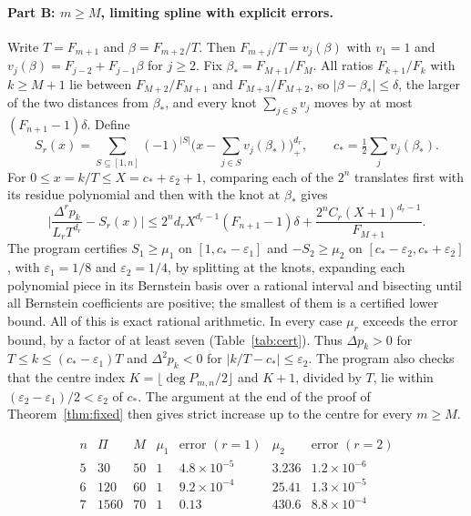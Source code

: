 \documentclass[11pt,a4paper]{article}
\theoremstyle{definition}\newtheorem{definition}[theorem]{Definition}
\theoremstyle{remark}\newtheorem{remark}[theorem]{Remark}\newtheorem{example}[theorem]{Example}
\numberwithin{equation}{section}
\begin{document}
\paragraph{Part B: $m\ge M$, limiting spline with explicit errors.} Write $T=F_{m+1}$ and $\beta=F_{m+2}/T$. Then $F_{m+j}/T=v_j(\beta)$ with $v_1=1$ and $v_j(\beta)=F_{j-2}+F_{j-1}\beta$ for $j\ge2$. Fix $\beta_*=F_{M+1}/F_M$. All ratios $F_{k+1}/F_k$ with $k\ge M+1$ lie between $F_{M+2}/F_{M+1}$ and $F_{M+3}/F_{M+2}$, so $|\beta-\beta_*|\le\delta$, the larger of the two distances from $\beta_*$, and every knot $\sum_{j\in S}v_j$ moves by at most $(F_{n+1}-1)\delta$. Define
\[
 S_r(x)=\sum_{S\subseteq[1,n]}(-1)^{|S|}\Big(x-\sum_{j\in S}v_j(\beta_*)\Big)_+^{d_r},\qquad c_*=\tfrac12\sum_jv_j(\beta_*).
\]
For $0\le x=k/T\le X=c_*+\varepsilon_2+1$, comparing each of the $2^n$ translates first with its residue polynomial and then with the knot at $\beta_*$ gives
\[
 \Big|\frac{\Delta^rp_k}{L_rT^{d_r}}-S_r(x)\Big|\le 2^nd_rX^{d_r-1}(F_{n+1}-1)\delta+\frac{2^nC_r(X+1)^{d_r-1}}{F_{M+1}}.
\]
The program certifies $S_1\ge\mu_1$ on $[1,c_*-\varepsilon_1]$ and $-S_2\ge\mu_2$ on $[c_*-\varepsilon_2,c_*+\varepsilon_2]$, with $\varepsilon_1=1/8$ and $\varepsilon_2=1/4$, by splitting at the knots, expanding each polynomial piece in its Bernstein basis over a rational interval and bisecting until all Bernstein coefficients are positive; the smallest of them is a certified lower bound. All of this is exact rational arithmetic. In every case $\mu_r$ exceeds the error bound, by a factor of at least seven (Table~\ref{tab:cert}). Thus $\Delta p_k>0$ for $T\le k\le(c_*-\varepsilon_1)T$ and $\Delta^2p_k<0$ for $|k/T-c_*|\le\varepsilon_2$. The program also checks that the centre index $K=\lfloor\deg P_{m,n}/2\rfloor$ and $K+1$, divided by $T$, lie within $(\varepsilon_2-\varepsilon_1)/2<\varepsilon_2$ of $c_*$. The argument at the end of the proof of Theorem~\ref{thm:fixed} then gives strict increase up to the centre for every $m\ge M$.

\begin{table}[ht]\centering
\[
\begin{array}{c|r|r|r|r|r|r}
 n & \Pi & M & \mu_1 & \text{error }(r=1) & \mu_2 & \text{error }(r=2)\\\hline
 5 & 30 & 50 & 1 & 4.8\times10^{-5} & 3.236 & 1.2\times10^{-6}\\
 6 & 120 & 60 & 1 & 9.2\times10^{-4} & 25.41 & 1.3\times10^{-5}\\
 7 & 1560 & 70 & 1 & 0.13 & 430.6 & 8.8\times10^{-4}
\end{array}
\]
\caption{Certificate data. $\Pi$: period of the residue polynomials; $M$: threshold between the exact range and the spline range; $\mu_r$: certified Bernstein lower bounds; error: the bound displayed in Part~B, rounded up; $\mu_2$ rounded down.}\label{tab:cert}
\end{table}
\end{document}
